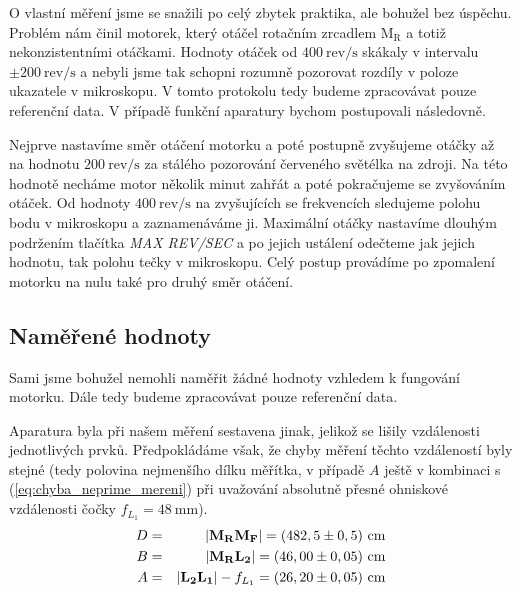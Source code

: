 \documentclass[english]{article}
\newcommand{\unit}[1]{\ \mathrm{#1}}
\newcommand{\bb}[1]{\boldmath{}\textbf{$\mathrm{#1}$}\unboldmath{}}
\begin{document}
		O vlastní měření jsme se snažili po celý zbytek praktika, ale bohužel bez úspěchu. Problém nám činil motorek, který otáčel rotačním zrcadlem \bb{M_R} a totiž nekonzistentními otáčkami. Hodnoty otáček od $400\unit{rev/s}$ skákaly v intervalu $\pm 200\unit{rev/s}$ a nebyli jsme tak schopni rozumně pozorovat rozdíly v poloze ukazatele v mikroskopu. V tomto protokolu tedy budeme zpracovávat pouze referenční data. V případě funkční aparatury bychom postupovali následovně. 
		
		Nejprve nastavíme směr otáčení motorku a poté postupně zvyšujeme otáčky až na hodnotu $200\unit{rev/s}$ za stálého pozorování červeného světélka na zdroji. Na této hodnotě necháme motor několik minut zahřát a poté pokračujeme se zvyšováním otáček. Od hodnoty $400\unit{rev/s}$ na zvyšujících se frekvencích sledujeme polohu bodu v mikroskopu a zaznamenáváme ji. Maximální otáčky nastavíme dlouhým podržením tlačítka \emph{MAX REV/SEC} a po jejich ustálení odečteme jak jejich hodnotu, tak polohu tečky v mikroskopu. Celý postup provádíme po zpomalení motorku na nulu také pro druhý směr otáčení.
	 
	\subsection{Naměřené hodnoty}
		Sami jsme bohužel nemohli naměřit žádné hodnoty vzhledem k fungování motorku. Dále tedy budeme zpracovávat pouze referenční data. 
		
		Aparatura byla při našem měření sestavena jinak, jelikož se lišily vzdálenosti jednotlivých prvků. Předpokládáme však, že chyby měření těchto vzdáleností byly stejné (tedy polovina nejmenšího dílku měřítka, v případě $A$ ještě v kombinaci s (\ref{eq:chyba_neprime_mereni}) při uvažování absolutně přesné ohniskové vzdálenosti čočky $f_{L_1} = 48\unit{mm}$). 
		\begin{eqnarray*}
			D &=& |\bb{M_R M_F}| = (482,5\pm0,5)\unit{cm}  \\
			B &=& |\bb{M_R L_2}| = (46,00\pm0,05)\unit{cm} \\
			A &=& |\bb{L_2 L_1}|-f_{L_1} = (26,20\pm0,05) \unit{cm} \\
		\end{eqnarray*}
		
\end{document}
